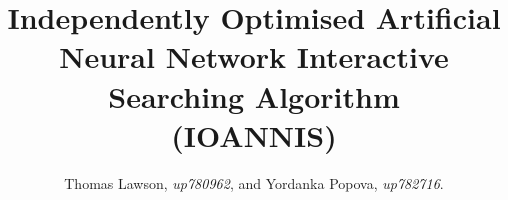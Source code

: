 \title{Independently Optimised Artificial Neural Network Interactive Searching Algorithm\\ (IOANNIS)}

\author{Thomas Lawson, \textit{up780962}, and Yordanka Popova, \textit{up782716}.}

\maketitle